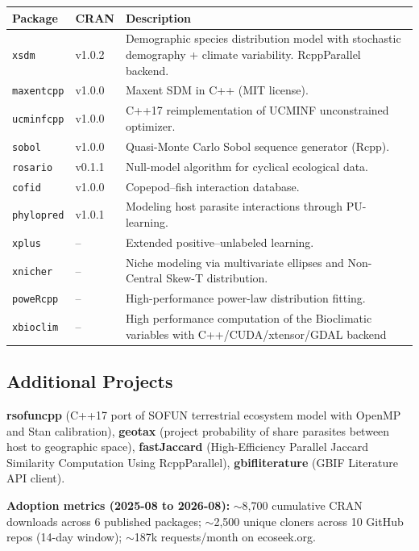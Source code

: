 \documentclass[11pt,a4paper]{article}
\begin{document}
\noindent\begin{tabularx}{\linewidth}{@{}p{2.4cm}p{1.8cm}X@{}}
\toprule
\textbf{Package} & \textbf{CRAN} & \textbf{Description} \\
\midrule
\texttt{xsdm} & v1.0.2 & Demographic species distribution model with stochastic demography + climate variability. RcppParallel backend. \\
\texttt{maxentcpp} & v1.0.0 & Maxent SDM in C++ (MIT license). \\
\texttt{ucminfcpp} & v1.0.0 & C++17 reimplementation of UCMINF unconstrained optimizer. \\
\texttt{sobol} & v1.0.0 & Quasi-Monte Carlo Sobol sequence generator (Rcpp). \\
\texttt{rosario} & v0.1.1 & Null-model algorithm for cyclical ecological data. \\
\texttt{cofid} & v1.0.0 & Copepod--fish interaction database. \\
\texttt{phylopred} & v1.0.1 & Modeling host parasite interactions through PU-learning. \\
\texttt{xplus} & -- & Extended positive--unlabeled learning. \\
\texttt{xnicher} & -- & Niche modeling via multivariate ellipses and Non-Central Skew-T distribution. \\
\texttt{poweRcpp} & -- & High-performance power-law distribution fitting. \\
\texttt{xbioclim} & -- & High performance computation of the Bioclimatic variables with C++/CUDA/xtensor/GDAL backend \\
\bottomrule
\end{tabularx}

\subsection*{Additional Projects}

\textbf{rsofuncpp} (C++17 port of SOFUN terrestrial ecosystem model with OpenMP and Stan calibration), \textbf{geotax} (project probability of share parasites between host to geographic space), \textbf{fastJaccard} (High-Efficiency Parallel Jaccard Similarity Computation Using RcppParallel), \textbf{gbifliterature} (GBIF Literature API client).

\textbf{Adoption metrics (2025-08 to 2026-08):} $\sim$8{,}700 cumulative CRAN downloads across 6 published packages; $\sim$2{,}500 unique cloners across 10 GitHub repos (14-day window); $\sim$187k requests/month on ecoseek.org.
\end{document}

